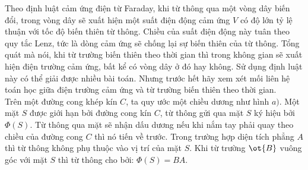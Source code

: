 \begin{vd}
Theo định luật cảm ứng điện từ Faraday, khi từ thông qua một vòng dây biến đổi, trong vòng dây sẽ xuất hiện một suất điện động cảm ứng ${V}$ có độ lớn tỷ lệ thuận với tốc độ biến thiên từ thông. Chiều của suất điện động này tuân theo quy tắc Lenz, tức là dòng cảm ứng sẽ chống lại sự biến thiên của từ thông. Tổng quát mà nói, khi từ trường biến thiên theo thời gian thì trong không gian sẽ xuất hiện điện trường cảm ứng, bất kể có vòng dây ở đó hay không. Sử dụng định luật này có thể giải được nhiều bài toán. Nhưng trước hết hãy xem xét mối liên hệ toán học giữa điện trường cảm ứng và từ trường biến thiên theo thời gian.\\
Trên một đường cong khép kín ${C}$, ta quy ước một chiều dương như hình ${a})$. Một mặt ${S}$ được giới hạn bởi đường cong kín ${C}$, từ thông gửi qua mặt ${S}$ ký hiệu bởi $\Phi({S})$. Từ thông qua mặt sẽ nhận dấu dương nếu khi nắm tay phải quay theo chiều của đường cong ${C}$ thì nó tiến về trước. Trong trường hợp diện tích phẳng $A$ thì từ thông không phụ thuộc vào vị trí của mặt $S$. Khi từ trường $\ot{B}$ vuông góc với mặt ${S}$ thì từ thông cho bởi: $\Phi({S}) = {BA}$.
\begin{center}



\begin{tikzpicture}[x=0.75pt,y=0.75pt,yscale=-1,xscale=1]


\end{tikzpicture}
\end{center}
\end{vd}
